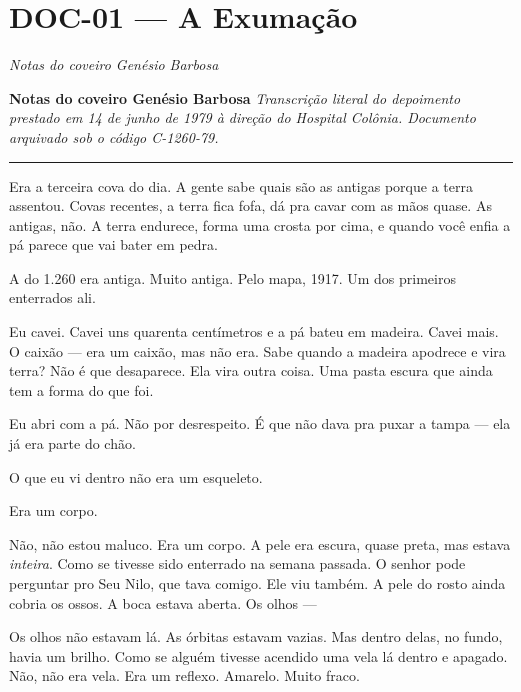 \section*{\textbf{DOC-01} --- A Exumação}

\noindent \textit{Notas do coveiro Genésio Barbosa}

\noindent \textbf{Notas do coveiro Genésio Barbosa}
\textit{Transcrição literal do depoimento prestado em 14 de junho de 1979 à direção do Hospital Colônia. Documento arquivado sob o código C-1260-79.}

\vspace{0.5em}\noindent\rule{\textwidth}{0.5pt}\vspace{0.5em}

\noindent Era a terceira cova do dia. A gente sabe quais são as antigas porque a terra assentou. Covas recentes, a terra fica fofa, dá pra cavar com as mãos quase. As antigas, não. A terra endurece, forma uma crosta por cima, e quando você enfia a pá parece que vai bater em pedra.

\noindent A do 1.260 era antiga. Muito antiga. Pelo mapa, 1917. Um dos primeiros enterrados ali.

\noindent Eu cavei. Cavei uns quarenta centímetros e a pá bateu em madeira. Cavei mais. O caixão --- era um caixão, mas não era. Sabe quando a madeira apodrece e vira terra? Não é que desaparece. Ela vira outra coisa. Uma pasta escura que ainda tem a forma do que foi.

\noindent Eu abri com a pá. Não por desrespeito. É que não dava pra puxar a tampa --- ela já era parte do chão.

\noindent O que eu vi dentro não era um esqueleto.

\noindent Era um corpo.

\noindent Não, não estou maluco. Era um corpo. A pele era escura, quase preta, mas estava \textit{inteira}. Como se tivesse sido enterrado na semana passada. O senhor pode perguntar pro Seu Nilo, que tava comigo. Ele viu também. A pele do rosto ainda cobria os ossos. A boca estava aberta. Os olhos ---

\noindent Os olhos não estavam lá. As órbitas estavam vazias. Mas dentro delas, no fundo, havia um brilho. Como se alguém tivesse acendido uma vela lá dentro e apagado. Não, não era vela. Era um reflexo. Amarelo. Muito fraco.

